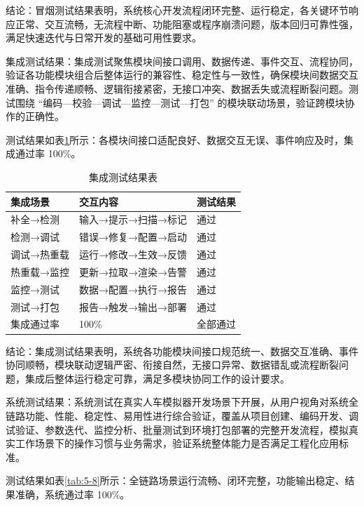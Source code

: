 结论：冒烟测试结果表明，系统核心开发流程闭环完整、运行稳定，各关键环节响应正常、交互流畅，无流程中断、功能阻塞或程序崩溃问题，版本回归可靠性强，满足快速迭代与日常开发的基础可用性要求。

集成测试结果：集成测试聚焦模块间接口调用、数据传递、事件交互、流程协同，验证各功能模块组合后整体运行的兼容性、稳定性与一致性，确保模块间数据交互准确、指令传递顺畅、逻辑衔接紧密，无接口冲突、数据丢失或流程断裂问题。测试围绕
“编码—校验—调试—监控—测试—打包”
的模块联动场景，验证跨模块协作的正确性。

测试结果如表\ref{tab:5-7}所示：各模块间接口适配良好、数据交互无误、事件响应及时，集成通过率
100\%。

\begin{table}[H]
\centering
\caption{集成测试结果表}
\label{tab:5-7}
\footnotesize
\renewcommand{\arraystretch}{1.18}
\begin{tabularx}{\textwidth}{p{}Xp{}}
\toprule
集成场景 & 交互内容 & 测试结果 \\
\midrule
补全→检测 & 输入→提示→扫描→标记 & 通过 \\
检测→调试 & 错误→修复→配置→启动 & 通过 \\
调试→热重载 & 运行→修改→生效→反馈 & 通过 \\
热重载→监控 & 更新→拉取→渲染→告警 & 通过 \\
监控→测试 & 数据→配置→执行→报告 & 通过 \\
测试→打包 & 报告→触发→输出→部署 & 通过 \\
集成通过率 & 100\% & 全部通过 \\
\bottomrule
\end{tabularx}
\end{table}



结论：集成测试结果表明，系统各功能模块间接口规范统一、数据交互准确、事件协同顺畅，模块联动逻辑严密、衔接自然，无接口异常、数据错乱或流程断裂问题，集成后整体运行稳定可靠，满足多模块协同工作的设计要求。

系统测试结果：系统测试在真实人车模拟器开发场景下开展，从用户视角对系统全链路功能、性能、稳定性、易用性进行综合验证，覆盖从项目创建、编码开发、调试验证、参数迭代、监控分析、批量测试到环境打包部署的完整开发流程，模拟真实工作场景下的操作习惯与业务需求，验证系统整体能力是否满足工程化应用标准。

测试结果如表\ref{tab:5-8}所示：全链路场景运行流畅、闭环完整，功能输出稳定、结果准确，系统通过率
100\%。

